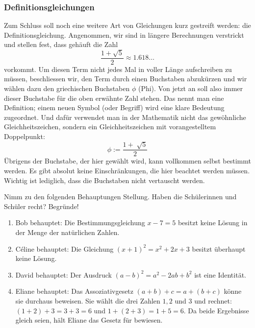 \documentclass[11pt,oneside]{article}
\begin{document}
	\subsubsection*{Definitionsgleichungen}
		Zum Schluss soll noch eine weitere Art von Gleichungen kurz gestreift werden: die Definitionsgleichung. Angenommen, wir sind in längere Berechnungen verstrickt und stellen fest, dass gehäuft die Zahl \[\frac{1+\sqrt{5}}{2}\approx 1.618\ldots\] vorkommt. Um diesen Term nicht jedes Mal in voller Länge aufschreiben zu müssen, beschliessen wir, den Term durch einen Buchstaben abzukürzen und wir wählen dazu den griechischen Buchstaben $\phi$ (Phi). Von jetzt an soll also immer dieser Buchstabe für die oben erwähnte Zahl stehen. Das nennt man eine Definition; einem neuen Symbol (oder Begriff) wird eine klare Bedeutung zugeordnet. Und dafür verwendet man in der Mathematik nicht das gewöhnliche Gleichheitszeichen, sondern ein Gleichheitszeichen mit vorangestelltem Doppelpunkt: \[\phi:=\frac{1+\sqrt[]{5}}{2}\]
		Übrigens der Buchstabe, der hier gewählt wird, kann vollkommen selbst bestimmt werden. Es gibt absolut keine Einschränkungen, die hier beachtet werden müssen. Wichtig ist lediglich, dass die Buchstaben nicht vertauscht werden.
	\begin{aufgabe} %
		Nimm zu den folgenden Behauptungen Stellung. Haben die Schülerinnen und Schüler recht? Begründe!
		\begin{enumerate}[label=\alph*)]
			\item Bob behauptet: \flqq Die Bestimmungsgleichung $x-7=5$ besitzt keine Lösung in der Menge der natürlichen Zahlen.\frqq
			\item Céline behauptet: \flqq Die Gleichung $(x+1)^2=x^2+2x+3$ besitzt überhaupt keine Lösung.\frqq
			\item David behauptet: \flqq Der Ausdruck $(a-b)^2=a^2-2ab+b^2$ ist eine Identität.\frqq
			\item Eliane behauptet: Das Assoziativgesetz $(a+b)+c=a+(b+c)$ könne sie durchaus beweisen. Sie wählt die drei Zahlen $1, 2$ und $3$ und rechnet: $(1+2)+3=3+3=6$ und $1+(2+3)=1+5=6$. Da beide Ergebnisse gleich seien, hält Eliane das Gesetz für bewiesen.
		\end{enumerate}
	\end{aufgabe}


\newpage
\end{document}
